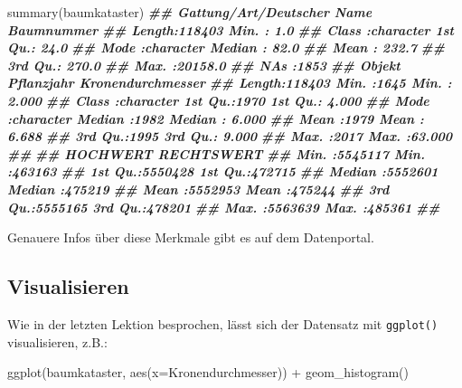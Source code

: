 \documentclass[
  ngerman,
]{article}
\newenvironment{Shaded}{\begin{snugshade}}{\end{snugshade}}
\newcommand{\AttributeTok}[1]{\textcolor[rgb]{0.77,0.63,0.00}{#1}}
\newcommand{\DocumentationTok}[1]{\textcolor[rgb]{0.56,0.35,0.01}{\textbf{\textit{#1}}}}
\newcommand{\FunctionTok}[1]{\textcolor[rgb]{0.00,0.00,0.00}{#1}}
\newcommand{\NormalTok}[1]{#1}
\newcommand{\SpecialCharTok}[1]{\textcolor[rgb]{0.00,0.00,0.00}{#1}}
\begin{document}
\begin{Shaded}
\begin{Highlighting}[]
\FunctionTok{summary}\NormalTok{(baumkataster)}
\DocumentationTok{\#\#  Gattung/Art/Deutscher Name   Baumnummer     }
\DocumentationTok{\#\#  Length:118403              Min.   :    1.0  }
\DocumentationTok{\#\#  Class :character           1st Qu.:   24.0  }
\DocumentationTok{\#\#  Mode  :character           Median :   82.0  }
\DocumentationTok{\#\#                             Mean   :  232.7  }
\DocumentationTok{\#\#                             3rd Qu.:  270.0  }
\DocumentationTok{\#\#                             Max.   :20158.0  }
\DocumentationTok{\#\#                             NA\textquotesingle{}s   :1853     }
\DocumentationTok{\#\#     Objekt            Pflanzjahr   Kronendurchmesser}
\DocumentationTok{\#\#  Length:118403      Min.   :1645   Min.   : 2.000   }
\DocumentationTok{\#\#  Class :character   1st Qu.:1970   1st Qu.: 4.000   }
\DocumentationTok{\#\#  Mode  :character   Median :1982   Median : 6.000   }
\DocumentationTok{\#\#                     Mean   :1979   Mean   : 6.688   }
\DocumentationTok{\#\#                     3rd Qu.:1995   3rd Qu.: 9.000   }
\DocumentationTok{\#\#                     Max.   :2017   Max.   :63.000   }
\DocumentationTok{\#\#                                                     }
\DocumentationTok{\#\#     HOCHWERT         RECHTSWERT    }
\DocumentationTok{\#\#  Min.   :5545117   Min.   :463163  }
\DocumentationTok{\#\#  1st Qu.:5550428   1st Qu.:472715  }
\DocumentationTok{\#\#  Median :5552601   Median :475219  }
\DocumentationTok{\#\#  Mean   :5552953   Mean   :475244  }
\DocumentationTok{\#\#  3rd Qu.:5555165   3rd Qu.:478201  }
\DocumentationTok{\#\#  Max.   :5563639   Max.   :485361  }
\DocumentationTok{\#\# }
\end{Highlighting}
\end{Shaded}

Genauere Infos über diese Merkmale gibt es auf dem Datenportal.

\hypertarget{visualisieren}{%
\subsection{Visualisieren}\label{visualisieren}}

Wie in der letzten Lektion besprochen, lässt sich der Datensatz mit \texttt{ggplot()} visualisieren, z.B.:

\begin{Shaded}
\begin{Highlighting}[]
\FunctionTok{ggplot}\NormalTok{(baumkataster, }\FunctionTok{aes}\NormalTok{(}\AttributeTok{x=}\NormalTok{Kronendurchmesser)) }\SpecialCharTok{+}
  \FunctionTok{geom\_histogram}\NormalTok{()}
\end{Highlighting}
\end{Shaded}
\end{document}
